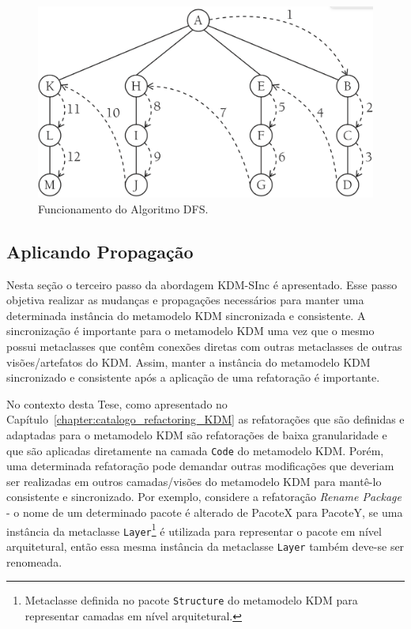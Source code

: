 \begin{figure}[h]
	\centering
	\caption{Funcionamento do Algoritmo DFS.}
	\label{fig:dfsalg}
	\includegraphics[scale=0.3]{images/algWorks2}
	\fautor
\end{figure}

\subsection{Aplicando Propagação}
Nesta seção o terceiro passo da abordagem KDM-SInc é apresentado. Esse passo objetiva realizar as mudanças e propagações necessários para manter uma determinada instância do metamodelo KDM sincronizada e consistente. A sincronização é importante para o metamodelo KDM uma vez que o mesmo possui metaclasses que contêm conexões diretas com outras metaclasses de outras visões/artefatos do KDM. Assim, manter a instância do metamodelo KDM sincronizado e consistente após a aplicação de uma refatoração é importante. 

No contexto desta Tese, como apresentado no Capítulo~\ref{chapter:catalogo_refactoring_KDM} as refatorações que são definidas e adaptadas para o metamodelo KDM são refatorações de baixa granularidade e que são aplicadas diretamente na camada \texttt{Code} do metamodelo KDM. Porém, uma determinada refatoração pode demandar outras modificações que deveriam ser realizadas em outros camadas/visões do metamodelo KDM para mantê-lo consistente e sincronizado. Por exemplo, considere a refatoração \textit{Rename Package} - o nome de um determinado pacote é alterado de PacoteX para PacoteY, se uma instância da metaclasse \texttt{Layer}\footnote{Metaclasse definida no pacote \texttt{Structure} do metamodelo KDM para representar camadas em nível arquitetural.} é utilizada para representar o pacote em nível arquitetural, então essa mesma instância da metaclasse \texttt{Layer} também deve-se ser renomeada. 

